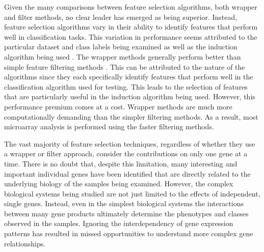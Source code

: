 {%
Given the many comparisons between feature selection algorithms, both wrapper
and filter methods, no clear leader has emerged as being superior.  Instead,
feature selection algorithms vary in their ability to identify features that
perform well in classification tasks.  This variation in performance seems
attributed to the particular dataset and class labels being examined as well as
the induction algorithm being used \cite{guyon2002gsc,PMID_15087314}.  The
wrapper methods generally perform better than simple feature filtering methods
\cite{Ng_1998,Berrar_2003}.  This can be attributed to the nature of the
algorithms since they each specifically identify features that perform well in
the classification algorithm used for testing.  This leads to the selection of
features that are particularly useful in the induction algorithm being used.
However, this performance premium comes at a cost.  Wrapper methods are much
more computationally demanding than the simpler filtering methods.  As a
result, most microarray analysis is performed using the faster filtering
methods.  

The vast majority of feature selection techniques, regardless of whether they
use a wrapper or filter approach, consider the contributions on only one gene
at a time. There is no doubt that, despite this limitation, many interesting
and important individual genes have been identified that are directly related
to the underlying biology of the samples being examined.  However, the complex
biological systems being studied are not just limited to the effects of
independent, single genes.  Instead, even in the simplest biological systems
the interactions between many gene products ultimately determine the phenotypes
and classes observed in the samples.  Ignoring the interdependency of gene
expression patterns has resulted in missed opportunities to understand more
complex gene relationships.

}
